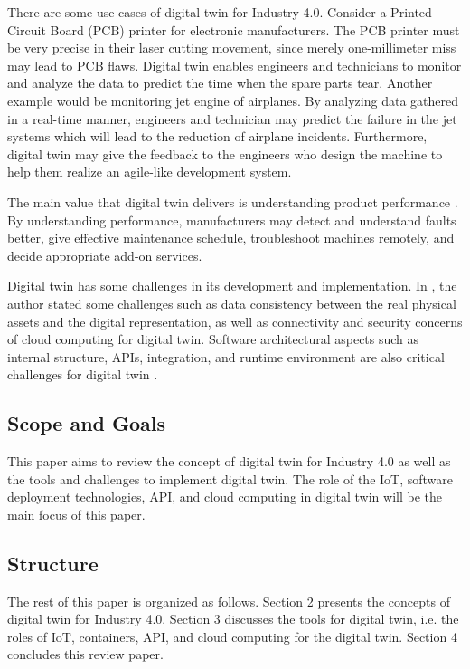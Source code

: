\documentclass[article]{aaltoseries}
\begin{document}
There are some use cases of digital twin for Industry 4.0. Consider a Printed Circuit Board (PCB) printer for electronic manufacturers. The PCB printer must be very precise in their laser cutting movement, since merely one-millimeter miss may lead to PCB flaws. Digital twin enables engineers and technicians to monitor and analyze the data to predict the time when the spare parts tear. Another example would be monitoring jet engine of airplanes. By analyzing data gathered in a real-time manner, engineers and technician may predict the failure in the jet systems which will lead to the reduction of airplane incidents. Furthermore, digital twin may give the feedback to the engineers who design the machine to help them realize an agile-like development system.

The main value that digital twin delivers is understanding product performance \cite{Cheatshe3:online}. By understanding performance, manufacturers may detect and understand faults better, give effective maintenance schedule, troubleshoot machines remotely, and decide appropriate add-on services.

Digital twin has some challenges in its development and implementation. In \cite{bienhaus2017patterns}, the author stated some challenges such as data consistency between the real physical assets and the digital representation, as well as connectivity and security concerns of cloud computing for digital twin. Software architectural aspects such as internal structure, APIs, integration, and runtime environment are also critical challenges for digital twin \cite{malakuti2018architectural}.

\subsection{Scope and Goals}
\label{sec:emphasis}
This paper aims to review the concept of digital twin for Industry 4.0 as well as the tools and challenges to implement digital twin. The role of the IoT, software deployment technologies, API, and cloud computing in digital twin will be the main focus of this paper.

\subsection{Structure}
\label{sec:em}
The rest of this paper is organized as follows. Section 2 presents the concepts of digital twin for Industry 4.0. Section 3 discusses the tools for digital twin, i.e. the roles of IoT, containers, API, and cloud computing for the digital twin. Section 4 concludes this review paper.
 
\end{document}
